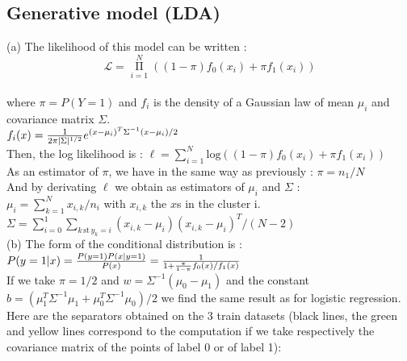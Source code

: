 \documentclass[11pt,a4paper]{article}
\begin{document}
\subsection{Generative model (LDA)}
%
%
\hspace*{-6mm}(a) The likelihood of this model can be written : 
%
$$\mathcal{L} = \mathop{\Pi}\limits_{i=1}^N ((1-\pi) f_0(x_i) + \pi f_1(x_i))$$
%
\\where $\pi = P(Y = 1)$ and $f_i$ is the density of a Gaussian law of mean $\mu_i$ and covariance matrix $\Sigma$.
\\ $f_i(x) = {1 \over 2 \pi |\Sigma|^{1/2}} e^{(x-\mu_i)^{T} \Sigma^{-1} (x-\mu_i) / 2}$
\\Then, the log likelihood is : $\ell =  \sum\limits_{i=1}^N \mathrm{log} ((1-\pi) f_0(x_i) + \pi f_1(x_i))$
\\As an estimator of $\pi$, we have in the same way as previously : $\pi = n_1/N$ 
\\And by derivating $\ell$ we obtain as estimators of $\mu_i$ and $\Sigma$ :
\\$\mu_i = \sum\limits_{k=1}^N x_{i,k}/n_i$ with $x_{i,k}$ the $x$s in the cluster i.
\\$\Sigma = \sum\limits_{i=0}^1 \sum\limits_{k \, \mathrm{st} \, y_k = i} (x_{i,k} - \mu_i) (x_{i,k} - \mu_i)^{T} / (N-2)$ %
%
%
\\[5mm](b) The form of the conditional distribution is :
\\$P(y=1|x) = {P(y=1) P(x|y=1) \over P(x)} = {1 \over 1+{\pi \over 1-\pi} f_0(x)/f_1(x)}$
\\If we take $\pi = 1/2$ and $w = \Sigma^{-1} (\mu_0 - \mu_1)$ and the constant
$b = (\mu_1^{T} \Sigma^{-1} \mu_1 + \mu_0^{T} \Sigma^{-1} \mu_0)/2$ we find the same result as for logistic regression.
%
%
\\[5mm] Here are the separators obtained on the 3 train datasets (black lines, the green and yellow lines correspond to the computation if we take respectively the covariance matrix of the points of label 0 or of label 1): 
\end{document}
